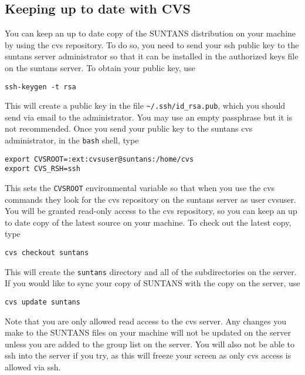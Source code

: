 \subsection{Keeping up to date with CVS} \label{sec:cvs}

You can keep an up to date copy of the SUNTANS distribution on your machine by using the
cvs repository.  To do so, you need to send your ssh public key to the suntans server administrator so that
it can be installed in the authorized keys file on the suntans server.  To obtain your
public key, use
\begin{verbatim}
ssh-keygen -t rsa
\end{verbatim}
This will create a public key in the file \verb+~/.ssh/id_rsa.pub+, which you should send
via email to the administrator.  You may use an empty passphrase but it is not recommended.
Once you send your public key to the suntans cvs administrator, in the \verb+bash+ shell, type
\begin{verbatim}
export CVSROOT=:ext:cvsuser@suntans:/home/cvs
export CVS_RSH=ssh
\end{verbatim}
This sets the \verb+CVSROOT+ environmental variable so that when you use the cvs commands
they look for the cvs repository on the suntans server as user cvsuser.
You will be granted read-only access to the cvs repository, so you can keep an up to date
copy of the latest source on your machine.  To check out the latest copy, type
\begin{verbatim}
cvs checkout suntans
\end{verbatim}
This will create the \verb+suntans+ directory and all of the subdirectories on the server.
If you would like to sync your copy of SUNTANS with the copy on the server, use
\begin{verbatim}
cvs update suntans
\end{verbatim}
Note that you are only allowed read access to the cvs server.  Any changes you make to
the SUNTANS files on your machine will not be updated on the server unless you are added
to the group list on the server.  You will also not be able to ssh into the server if you
try, as this will freeze your screen as only cvs access is allowed via ssh.
